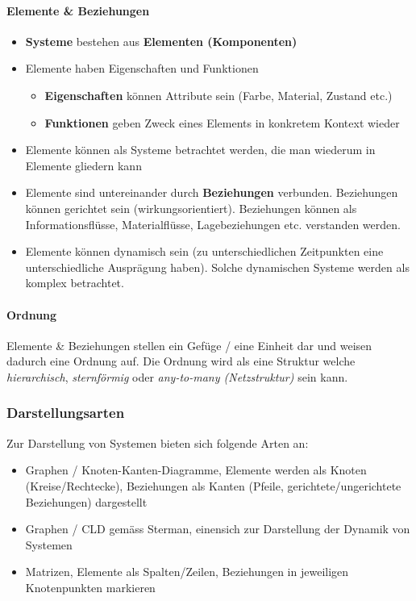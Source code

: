 \documentclass[a4paper]{article}
\begin{document}
			\paragraph{Elemente \& Beziehungen}
			\vspace{1em}
				\begin{itemize}
					\item \textbf{Systeme} bestehen aus \textbf{Elementen (Komponenten)}
					\item Elemente haben Eigenschaften und Funktionen
						\begin{itemize}
							\item \textbf{Eigenschaften} können Attribute sein (Farbe, Material, Zustand etc.)
							\item \textbf{Funktionen} geben Zweck eines Elements in konkretem Kontext wieder
						\end{itemize}
					\item Elemente können als Systeme betrachtet werden, die man wiederum in Elemente gliedern kann
					\item Elemente sind untereinander durch \textbf{Beziehungen} verbunden.
					Beziehungen können gerichtet sein (wirkungsorientiert). 
					Beziehungen können als Informationsflüsse, Materialflüsse, Lagebeziehungen etc. verstanden werden.
					\item Elemente können dynamisch sein (zu unterschiedlichen Zeitpunkten eine unterschiedliche Ausprägung haben).
					Solche dynamischen Systeme werden als komplex betrachtet.
				\end{itemize}
		
			\paragraph{Ordnung}
			
			Elemente \& Beziehungen stellen ein Gefüge / eine Einheit dar und weisen dadurch eine Ordnung auf.
			Die Ordnung wird als eine Struktur welche \textit{hierarchisch}, \textit{sternförmig} oder \textit{any-to-many (Netzstruktur)} sein kann.
			
		\subsubsection{Darstellungsarten}
		
		Zur Darstellung von Systemen bieten sich folgende Arten an:
		\vspace{1em}
		\begin{itemize}
			\item Graphen / Knoten-Kanten-Diagramme, Elemente werden als Knoten (Kreise/Rechtecke), Beziehungen als Kanten (Pfeile, gerichtete/ungerichtete Beziehungen) dargestellt
			\item Graphen / CLD gemäss Sterman, einensich zur Darstellung der Dynamik von Systemen
			\item Matrizen, Elemente als Spalten/Zeilen, Beziehungen in jeweiligen Knotenpunkten markieren
		\end{itemize}
	
\end{document}
